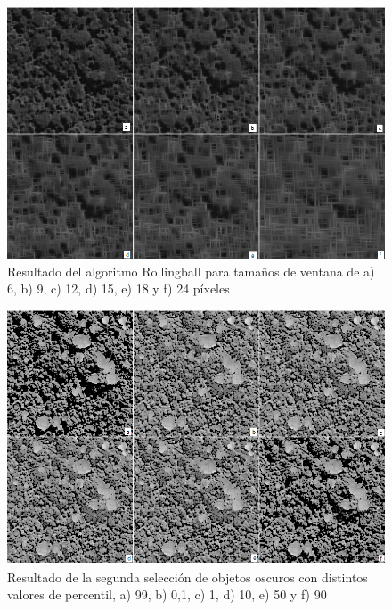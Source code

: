 \begin{figure}[h!]
    \includegraphics[width=\textwidth]{Imagenes/Resultados script morfologico/GS04-labeled.png}
     \caption{Resultado del algoritmo Rollingball para tamaños de ventana de a) 6, b) 9, c) 12, d) 15, e) 18 y f) 24 píxeles}
    \label{Rollingball}
\end{figure}
\begin{figure}[h!]
    \includegraphics[width=\textwidth]{Imagenes/Resultados script morfologico/GS06-labeled.png}
     \caption{Resultado de la segunda selección de objetos oscuros con distintos valores de percentil, a) 99, b) 0,1, c) 1, d) 10, e) 50 y f) 90 }
    \label{segundaoscuros}
\end{figure}
